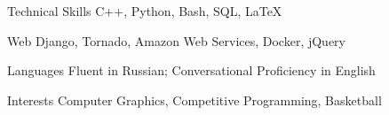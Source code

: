 

\begin{cvskills}

  \cvskill
    {Technical Skills} %
    {C++, Python, Bash, SQL, \LaTeX} %

  \cvskill
    {Web} %
    {Django, Tornado, Amazon Web Services, Docker, jQuery} %

  \cvskill
    {Languages} %
    {Fluent in Russian; Conversational Proficiency in English} %

  \cvskill
    {Interests} %
    {Computer Graphics, Competitive Programming, Basketball} %

\end{cvskills}

